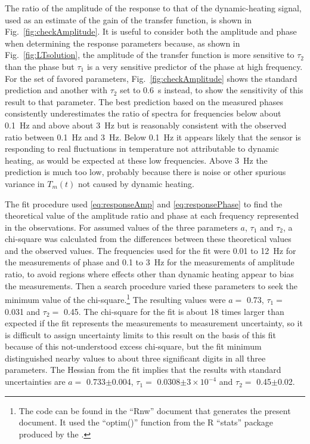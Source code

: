 \documentclass[11pt,twoside,american,12pt,twoside,american]{article}\usepackage[]{graphicx}\usepackage[]{color}
\begin{document}
The ratio of the amplitude of the response to that of the dynamic-heating
signal, used as an estimate of the gain of the transfer function,
is shown in Fig.~\ref{fig:checkAmplitude}. It is useful to consider
both the amplitude and phase when determining the response parameters
because, as shown in Fig.~\ref{fig:LTsolution}, the amplitude of
the transfer function is more sensitive to $\tau_{2}$ than the phase
but $\tau_{1}$ is a very sensitive predictor of the phase at high
frequency. For the set of favored parameters, Fig.~\ref{fig:checkAmplitude}
shows the standard prediction and another with $\tau_{2}$ set to
0.6~s instead, to show the sensitivity of this result to that parameter.
The best prediction based on the measured phases consistently underestimates
the ratio of spectra for frequencies below about 0.1~Hz and above
about 3~Hz but is reasonably consistent with the observed ratio between
0.1~Hz and 3~Hz. Below 0.1~Hz it appears likely that the sensor
is responding to real fluctuations in temperature not attributable
to dynamic heating, as would be expected at these low frequencies.
Above 3~Hz the prediction is much too low, probably because there
is noise or other spurious variance in $T_{m}(t)$ not caused by dynamic
heating. 



The fit procedure used \eqref{eq:responseAmp} and \eqref{eq:responsePhase}
to find the theoretical value of the amplitude ratio and phase at
each frequency represented in the observations. For assumed values
of the three parameters $a$, $\tau_{1}$ and $\tau_{2}$, a chi-square
was calculated from the differences between these theoretical values
and the observed values. The frequencies used for the fit were 0.01
to 12~Hz for the measurements of phase and 0.1 to 3~Hz for the measurements
of amplitude ratio, to avoid regions where effects other than dynamic
heating appear to bias the measurements. Then a search procedure varied
these parameters to seek the minimum value of the chi-square.\footnote{The code can be found in the ``Rnw'' document that generates the
present document. It used the ``optim()'' function from the R ``stats''
package produced by the \citet{Rlanguage}.} The resulting values were $a=$ 0.73, $\tau_{1}=$
0.031 and $\tau_{2}=$ 0.45.
The chi-square for the fit is about 18 times larger than expected
if the fit represents the measurements to measurement uncertainty,
so it is difficult to assign uncertainty limits to this result on
the basis of this fit because of this not-understood excess chi-square,
but the fit minimum distinguished nearby values to about three significant
digits in all three parameters. The Hessian from the fit implies that
the results with standard uncertainties are $a=$ 0.733$\pm$0.004,
$\tau_{1}=$ 0.0308$\pm$\ensuremath{3\times 10^{-4}}
and $\tau_{2}=$ 0.45$\pm$0.02.
\end{document}
